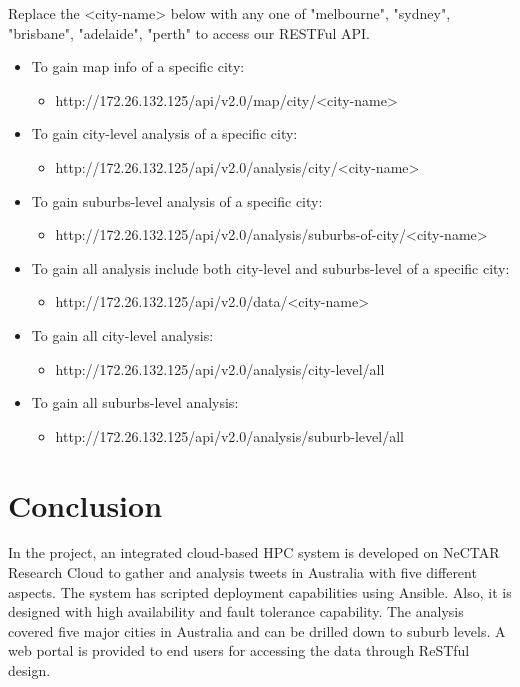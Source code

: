 \documentclass{article}
\begin{document}
Replace the <city-name> below with any one of "melbourne", "sydney", "brisbane", "adelaide", "perth" to access our RESTFul API.
\begin{itemize}
	\item To gain map info of a specific city:
	\begin{itemize}
		\item http://172.26.132.125/api/v2.0/map/city/<city-name>
	\end{itemize}

	\item To gain city-level analysis of a specific city:
	\begin{itemize}
		\item http://172.26.132.125/api/v2.0/analysis/city/<city-name>
	\end{itemize}

	\item To gain suburbs-level analysis of a specific city:
	\begin{itemize}
		\item http://172.26.132.125/api/v2.0/analysis/suburbs-of-city/<city-name>
	\end{itemize}

	\item To gain all analysis include both city-level and suburbs-level of a specific city:
	\begin{itemize}
		\item http://172.26.132.125/api/v2.0/data/<city-name>
	\end{itemize}

	\item To gain all city-level analysis:
	\begin{itemize}
		\item http://172.26.132.125/api/v2.0/analysis/city-level/all
	\end{itemize}

	\item To gain all suburbs-level analysis:
	\begin{itemize}
		\item http://172.26.132.125/api/v2.0/analysis/suburb-level/all
	\end{itemize}
\end{itemize}

\section{Conclusion}
In the project, an integrated cloud-based HPC system is developed on NeCTAR Research Cloud to gather and analysis tweets in Australia with five different aspects. The system has scripted deployment capabilities using Ansible. Also, it is designed with high availability and fault tolerance capability. The analysis covered five major cities in Australia and can be drilled down to suburb levels.  A web portal is provided to end users for accessing the data through ReSTful design.
\end{document}
